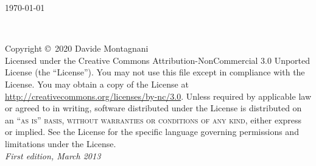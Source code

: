 \documentclass[11pt,fleqn]{book} %
\begin{document}

\begingroup
\thispagestyle{empty}
\vfill
\begin{center}
\today
\end{center}
\endgroup


\newpage
~\vfill
\thispagestyle{empty}

\noindent Copyright \copyright\ 2020 Davide Montagnani\\ %



\noindent Licensed under the Creative Commons Attribution-NonCommercial 3.0 Unported License (the ``License''). You may not use this file except in compliance with the License. You may obtain a copy of the License at \url{http://creativecommons.org/licenses/by-nc/3.0}. Unless required by applicable law or agreed to in writing, software distributed under the License is distributed on an \textsc{``as is'' basis, without warranties or conditions of any kind}, either express or implied. See the License for the specific language governing permissions and limitations under the License.\\ %

\noindent \textit{First edition, March 2013} %
\end{document}

